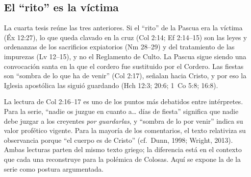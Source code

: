 \documentclass[11pt,letterpaper]{article}
\begin{document}
\subsection{El ``rito'' es la víctima}
La cuarta tesis reúne las tres anteriores. Si el ``rito'' de la Pascua era la víctima (Éx 12:27), lo que queda clavado en la cruz (Col 2:14; Ef 2:14--15) son las leyes y ordenanzas de los sacrificios expiatorios (Nm 28--29) y del tratamiento de las impurezas (Lv 12--15), y no el Reglamento de Culto. La Pascua sigue siendo una convocación santa en la que el cordero fue sustituido por el Cordero. Las fiestas son ``sombra de lo que ha de venir'' (Col 2:17), señalan hacia Cristo, y por eso la Iglesia apostólica las siguió guardando (Hch 12:3; 20:6; 1~Co 5:8; 16:8).

\begin{nota}[Precisión]
La lectura de Col 2:16--17 es uno de los puntos más debatidos entre intérpretes. Para la serie, ``nadie os juzgue en cuanto a\ldots{} días de fiesta'' significa que nadie debe juzgar a los creyentes \emph{por guardarlas}, y ``sombra de lo por venir'' indica su valor profético vigente. Para la mayoría de los comentarios, el texto relativiza su observancia porque ``el cuerpo es de Cristo'' (cf.\ Dunn, 1998; Wright, 2013). Ambas lecturas parten del mismo texto griego; la diferencia está en el contexto que cada una reconstruye para la polémica de Colosas. Aquí se expone la de la serie como postura argumentada.
\end{nota}
\end{document}
